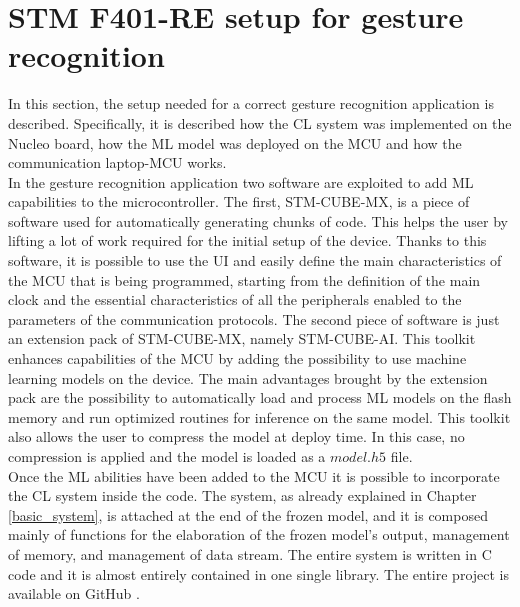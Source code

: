 \documentclass[12pt]{report}
\begin{document}
\section{STM F401-RE setup for gesture recognition}
\label{nucleo_application}
In this section, the setup needed for a correct gesture recognition application is described. Specifically, it is described how the CL system was implemented on the Nucleo board, how the ML model was deployed on the MCU and how the communication laptop-MCU works.\\
In the gesture recognition application two software are exploited to add ML capabilities to the microcontroller. The first, STM-CUBE-MX, is a piece of software used for automatically generating chunks of code. This helps the user by lifting a lot of work required for the initial setup of the device. Thanks to this software, it is possible to use the UI and easily define the main characteristics of the MCU that is being programmed, starting from the definition of the main clock and the essential characteristics of all the peripherals enabled to the parameters of the communication protocols. The second piece of software is just an extension pack of STM-CUBE-MX, namely STM-CUBE-AI. This toolkit enhances capabilities of the MCU by adding the possibility to use machine learning models on the device. The main advantages brought by the extension pack are the possibility to automatically load and process ML models on the flash memory and run optimized routines for inference on the same model. This toolkit also allows the user to compress the model at deploy time. In this case, no compression is applied and the model is loaded as a $model.h5$ file.\\
Once the ML abilities have been added to the MCU it is possible to incorporate the CL system inside the code. The system, as already explained in Chapter \ref{basic_system}, is attached at the end of the frozen model, and it is composed mainly of functions for the elaboration of the frozen model's output, management of memory, and management of data stream. The entire system is written in C code and it is almost entirely contained in one single library. The entire project is available on GitHub \cite{github_repo}.\\
\end{document}
